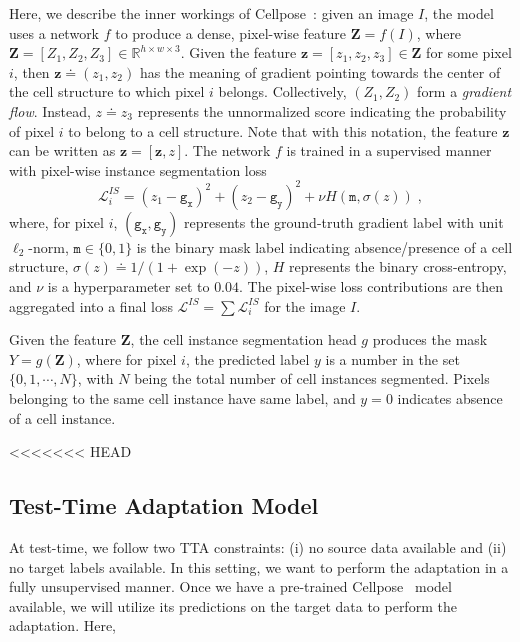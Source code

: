 Here, we describe the inner workings of Cellpose~\cite{stringer2021cellpose}: given an image $I$, the model uses a network $f$ to produce a dense, pixel-wise feature $\bm{Z} = f(I)$, where $ \bm{Z} = [Z_1, Z_2, Z_3] \in \mathbb{R}^{h \times w \times 3}$. Given the feature $\mathbf{z} = [z_1, z_2, z_3] \in \bm{Z}$ for some pixel $i$, then $\bm{z} \doteq (z_1, z_2)$ has the meaning of gradient pointing towards the center of the cell structure to which pixel $i$ belongs. Collectively, $(Z_1,Z_2)$ form a \emph{gradient flow}. Instead, $z \doteq z_3$ represents the unnormalized score indicating the probability of pixel $i$ to belong to a cell structure. Note that with this notation, the feature $\mathbf{z}$ can be written as $\mathbf{z} = [\bm{z}, z]$. The network $f$ is trained in a supervised manner with pixel-wise instance segmentation loss
\begin{equation}
  \mathcal{L}_i^{IS} = (z_1 - \mathtt{g_x})^2 + (z_2 - \mathtt{g_y})^2 + \nu H(\mathtt{m},\sigma(z))  \; ,
\end{equation}
where, for pixel $i$,  $(\mathtt{g_x}, \mathtt{g_y})$ represents the ground-truth gradient label with unit $\ell_2$-norm, $\mathtt{m} \in \{0, 1\}$ is the binary mask label indicating absence/presence of a cell structure, $\sigma(z) \doteq 1/(1+\exp(-z))$, $H$ represents the binary cross-entropy, and $\nu$ is a hyperparameter set to $0.04$. The pixel-wise loss contributions are then aggregated into a final loss $\mathcal{L}^{IS} = \sum \mathcal{L}_i^{IS}$ for the image $I$.


Given the feature $\bm{Z}$, the cell instance segmentation head $g$ produces the mask $Y = g(\bm{Z})$, where for pixel $i$, the predicted label $y$ is a number in the set $\{0, 1, \cdots, N \}$, with $N$ being the total number of cell instances segmented. Pixels belonging to the same cell instance have same label, and $y=0$ indicates absence of a cell instance. 


<<<<<<< HEAD
\subsection{Test-Time Adaptation Model}

At test-time, we follow two TTA constraints: (i) no source data available and (ii) no target labels available. In this setting, we want to perform the adaptation in a fully unsupervised manner. Once we have a pre-trained Cellpose~\cite{stringer2021cellpose} model available, we will utilize its predictions on the target data to perform the adaptation. Here,   

